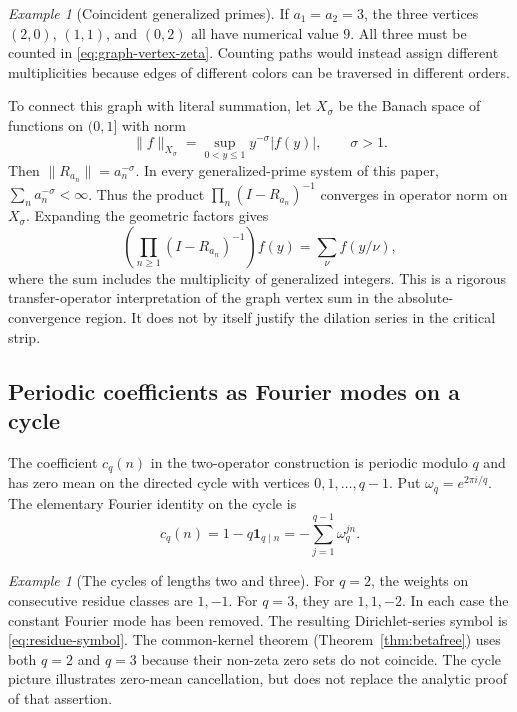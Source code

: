 \documentclass[12pt,letterpaper]{article}
\theoremstyle{definition}
\theoremstyle{remark}
\newtheorem{example}[theorem]{Example}
\numberwithin{equation}{section}
\begin{document}
\begin{example}[Coincident generalized primes]
If $a_1=a_2=3$, the three vertices $(2,0)$, $(1,1)$, and $(0,2)$
all have numerical value $9$.  All three must be counted in
\eqref{eq:graph-vertex-zeta}.  Counting paths would instead assign
different multiplicities because edges of different colors can be
traversed in different orders.
\end{example}

To connect this graph with literal summation, let $X_\sigma$ be the
Banach space of functions on $(0,1]$ with norm
\[
 \|f\|_{X_\sigma}=\sup_{0<y\le1} y^{-\sigma}|f(y)|,
 \qquad \sigma>1.
\]
Then $\|R_{a_n}\|=a_n^{-\sigma}$.  In every generalized-prime
system of this paper, $\sum_n a_n^{-\sigma}<\infty$.
Thus the product $\prod_n(I-R_{a_n})^{-1}$ converges in operator
norm on $X_\sigma$.  Expanding the geometric factors gives
\begin{equation}\label{eq:graph-transfer}
 \left(\prod_{n\ge1}(I-R_{a_n})^{-1}\right)f(y)
 =\sum_{\nu}f(y/\nu),
\end{equation}
where the sum includes the multiplicity of generalized integers.
This is a rigorous transfer-operator interpretation of the graph
vertex sum in the absolute-convergence region.
It does not by itself justify the dilation series in the critical strip.

\subsection{Periodic coefficients as Fourier modes on a cycle}

The coefficient $c_q(n)$ in the two-operator construction is periodic
modulo $q$ and has zero mean on the directed cycle with vertices
$0,1,\ldots,q-1$.  Put $\omega_q=e^{2\pi i/q}$.
The elementary Fourier identity on the cycle is
\begin{equation}\label{eq:graph-cycle-Fourier}
 c_q(n)=1-q\mathbf1_{q\mid n}
 =-\sum_{j=1}^{q-1}\omega_q^{jn}.
\end{equation}

\begin{example}[The cycles of lengths two and three]
For $q=2$, the weights on consecutive residue classes are $1,-1$.
For $q=3$, they are $1,1,-2$.  In each case the constant Fourier
mode has been removed.  The resulting Dirichlet-series symbol is
\eqref{eq:residue-symbol}.
The common-kernel theorem (Theorem~\ref{thm:betafree}) uses both
$q=2$ and $q=3$ because their non-zeta zero sets do not coincide.
The cycle picture illustrates zero-mean cancellation, but does not
replace the analytic proof of that assertion.
\end{example}
\end{document}
